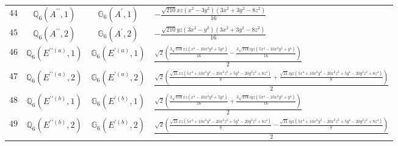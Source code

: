 \documentclass[fleqn,8pt,landscape]{jsarticle}
\begin{document}
\begin{table}[ht!]
\begin{center}
\begin{tabular}{cccl}
$ 44 $ & $ \mathbb{Q}_{6}(A^{\prime\prime},1) $ & $ \mathbb{G}_{6}(A^{\prime},1) $ & $ - \frac{\sqrt{210} x z \left(x^{2} - 3 y^{2}\right) \left(3 x^{2} + 3 y^{2} - 8 z^{2}\right)}{16} $ \\
$ 45 $ & $ \mathbb{Q}_{6}(A^{\prime\prime},2) $ & $ \mathbb{G}_{6}(A^{\prime},2) $ & $ - \frac{\sqrt{210} y z \left(3 x^{2} - y^{2}\right) \left(3 x^{2} + 3 y^{2} - 8 z^{2}\right)}{16} $ \\
$ 46 $ & $ \mathbb{Q}_{6}(E^{\prime\prime(a)},1) $ & $ \mathbb{G}_{6}(E^{\prime(a)},1) $ & $ \frac{\sqrt{2} \left(\frac{3 \sqrt{154} x z \left(x^{4} - 10 x^{2} y^{2} + 5 y^{4}\right)}{16} - \frac{3 \sqrt{154} i y z \left(5 x^{4} - 10 x^{2} y^{2} + y^{4}\right)}{16}\right)}{2} $ \\
$ 47 $ & $ \mathbb{Q}_{6}(E^{\prime\prime(a)},2) $ & $ \mathbb{G}_{6}(E^{\prime(a)},2) $ & $ \frac{\sqrt{2} \left(\frac{\sqrt{21} x z \left(5 x^{4} + 10 x^{2} y^{2} - 20 x^{2} z^{2} + 5 y^{4} - 20 y^{2} z^{2} + 8 z^{4}\right)}{8} + \frac{\sqrt{21} i y z \left(5 x^{4} + 10 x^{2} y^{2} - 20 x^{2} z^{2} + 5 y^{4} - 20 y^{2} z^{2} + 8 z^{4}\right)}{8}\right)}{2} $ \\
$ 48 $ & $ \mathbb{Q}_{6}(E^{\prime\prime(b)},1) $ & $ \mathbb{G}_{6}(E^{\prime(b)},1) $ & $ \frac{\sqrt{2} \left(\frac{3 \sqrt{154} x z \left(x^{4} - 10 x^{2} y^{2} + 5 y^{4}\right)}{16} + \frac{3 \sqrt{154} i y z \left(5 x^{4} - 10 x^{2} y^{2} + y^{4}\right)}{16}\right)}{2} $ \\
$ 49 $ & $ \mathbb{Q}_{6}(E^{\prime\prime(b)},2) $ & $ \mathbb{G}_{6}(E^{\prime(b)},2) $ & $ \frac{\sqrt{2} \left(\frac{\sqrt{21} x z \left(5 x^{4} + 10 x^{2} y^{2} - 20 x^{2} z^{2} + 5 y^{4} - 20 y^{2} z^{2} + 8 z^{4}\right)}{8} - \frac{\sqrt{21} i y z \left(5 x^{4} + 10 x^{2} y^{2} - 20 x^{2} z^{2} + 5 y^{4} - 20 y^{2} z^{2} + 8 z^{4}\right)}{8}\right)}{2} $ \\
 \hline \hline
\end{tabular}
\end{center}
\end{table}
\end{document}
